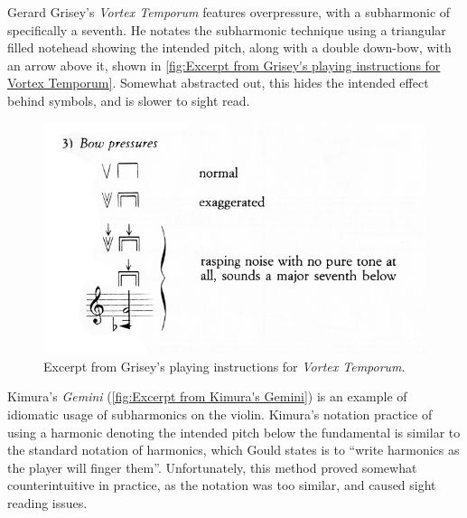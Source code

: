 


Gerard Grisey's \emph{Vortex Temporum} features overpressure, with a subharmonic of specifically a seventh.\autocite[]{griseyVortexTemporum}
He notates the subharmonic technique using a triangular filled notehead showing the intended pitch, along with a double down-bow, with an arrow above it, shown in \autoref{fig:Excerpt from Grisey's playing instructions for Vortex Temporum}. 
Somewhat abstracted out, this hides the intended effect behind symbols, and is slower to sight read.


\begin{figure}
\includegraphics[width=\linewidth]{./resources/griseyVortexTemporum.jpg}
\caption{Excerpt from Grisey's playing instructions for \emph{Vortex Temporum}.}\label{fig:Excerpt from Grisey's playing instructions for Vortex Temporum}\end{figure}


Kimura's \emph{Gemini} (\autoref{fig:Excerpt from Kimura's Gemini}) is an example of idiomatic usage of subharmonics on the violin.\autocite[]{kimuraGemini1992}
Kimura's notation practice of using a harmonic denoting the intended pitch below the fundamental is similar to the standard notation of harmonics, which Gould states is to ``write harmonics as the player will finger them''.\autocite[413]{gouldBars2011} 
Unfortunately, this method proved somewhat counterintuitive in practice, as the notation was too similar, and caused sight reading issues.\autocite[]{appleseedFeedbackExploratorySession2019}

